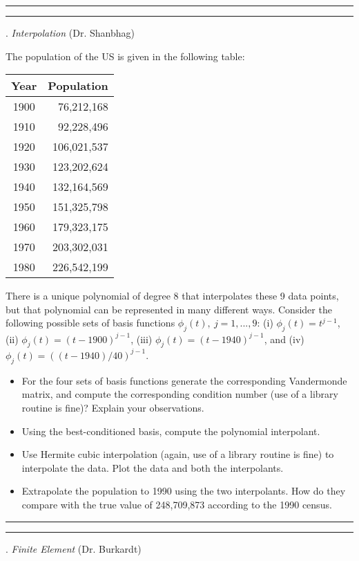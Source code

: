 \documentclass [11point]{article}
\begin{document}
\bigskip
\hrule 

\pagebreak
\hrule 
{}. \textit{Interpolation} (Dr. Shanbhag)
\bigskip

The population of the US is given in the following table:

\begin{center}
\begin{tabular}{|c|r|}
\hline 
\textbf{Year} & \textbf{Population} \\ 
\hline 
1900 & 76,212,168 \\ 
1910 & 92,228,496 \\ 
1920 & 106,021,537 \\ 
1930 & 123,202,624 \\ 
1940 & 132,164,569 \\ 
1950 & 151,325,798 \\ 
1960 & 179,323,175 \\ 
1970 & 203,302,031 \\ 
1980 & 226,542,199\\ 
\hline 
\end{tabular} 
\end{center}

There is a unique polynomial of degree 8 that interpolates these 9 data points, but that polynomial can be represented in many different ways. Consider the following possible sets of basis functions $\phi_j(t),~j = 1, ..., 9$: (i) $\phi_j(t) = t^{j-1}$, (ii) $\phi_j(t) = (t-1900)^{j-1}$, (iii) $\phi_j(t) = (t-1940)^{j-1}$, and (iv) $\phi_j(t) = ((t-1940)/40)^{j-1}$.

\begin{itemize}
\item For the four sets of basis functions generate the corresponding Vandermonde matrix, and compute the corresponding condition number (use of a library routine is fine)? Explain your observations.
\item Using the best-conditioned basis, compute the polynomial interpolant. 
\item Use Hermite cubic interpolation (again, use of a library routine is fine) to interpolate the data. Plot the data and both the interpolants.
\item Extrapolate the population to 1990 using the two interpolants. How do they compare with the true value of 248,709,873 according to the 1990 census.
\end{itemize}


\bigskip 
\hrule

\pagebreak
\hrule
{}. \textit{Finite Element} (Dr. Burkardt)
\bigskip
\end{document}
